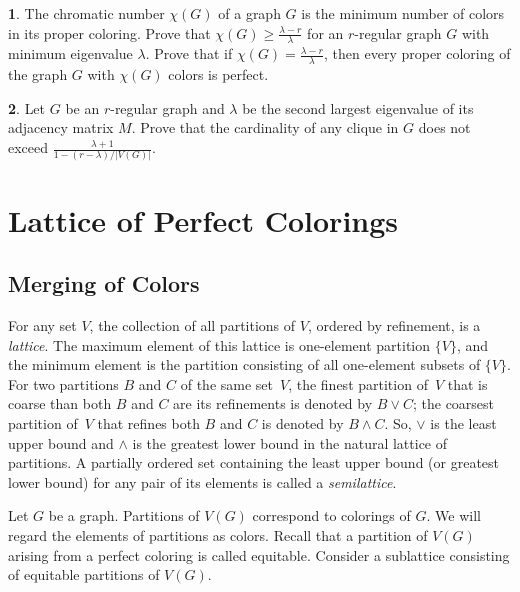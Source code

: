 \documentclass[11pt]{article}
\theoremstyle{definition}
\newtheorem{exercise}{\quad}
\begin{document}
\begin{exercise}
The chromatic number $\chi(G)$ of a graph $G$ is the minimum
number of colors in its proper coloring. Prove that $\chi(G)\geq
\frac{\lambda-r}{\lambda}$ for an $r$-regular graph $G$ with
minimum eigenvalue $\lambda$. Prove that if
$\chi(G)= \frac{\lambda-r}{\lambda}$, then every proper coloring
of the graph $G$ with $\chi(G)$ colors is perfect. \end{exercise}

\begin{exercise}
{ Let $G$ be an $r$-regular graph and $\lambda$ be the second largest eigenvalue  of its
adjacency matrix $M$. Prove that the cardinality of any clique in $G$ does not exceed
$\frac{\lambda+1}{1-(r-\lambda)/|V(G)|}$.}
\end{exercise}






\section{Lattice of Perfect Colorings}

\subsection{Merging of Colors}\label{SklCol}

For any set $V$,
 the collection of all partitions of 
$V$, ordered by refinement, is a {\sl lattice}. The maximum element of this lattice is one-element partition $\{V\}$, and the minimum element  is the partition consisting of all one-element subsets of $\{V\}$. 
For two partitions $B$ and $C$ of the same set~$V$,
the finest partition of~$V$ that is coarse  than both $B$ and $C$ are its refinements is denoted by $B \lor C$; the coarsest partition of~$V$ that   refines  both $B$ and $C$  is denoted by $B \wedge C$.  So,  $\lor$ is
the least upper bound  and  $\wedge$ is the greatest lower bound in the natural lattice of partitions.
A partially ordered set containing the least upper bound (or greatest lower bound) for any pair of its elements is called a {\sl semilattice}. 


Let $G$ be a graph.  Partitions of $V(G)$ correspond to colorings of $G$. We will regard the elements of partitions as colors. Recall  that a partition of  $V(G)$ arising from a perfect coloring is called equitable. 
Consider a sublattice consisting of equitable partitions of $V(G)$. 
\end{document}
